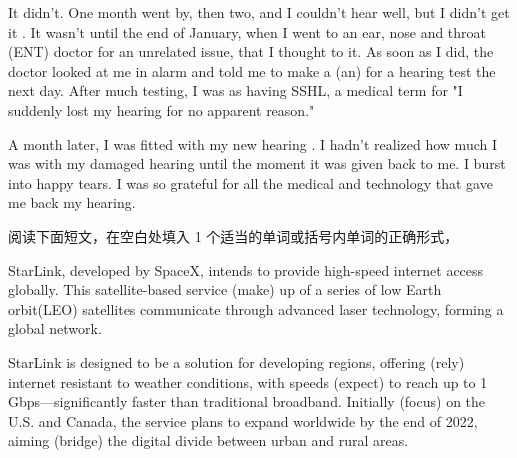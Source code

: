 \documentclass{英语试卷}
\begin{document}
\par It didn't. One month went by, then two, and I  couldn't hear well, but I didn't get it . It wasn't until the end of January, when I went to an ear, nose and throat (ENT) doctor for an unrelated issue, that I thought to  it. As soon as I did, the doctor looked at me in alarm and told me to make a (an)  for a hearing test the next day. After much testing, I was  as having SSHL, a medical term for "I suddenly lost my hearing for no apparent reason."\par
\par A month later, I was fitted with my new hearing . I hadn't realized how much I was  with my damaged hearing until the moment it was given back to me. I burst into happy tears. I was so grateful for all the medical  and technology that gave me back my hearing.\par
{}
\par 阅读下面短文，在空白处填入 1 个适当的单词或括号内单词的正确形式，\par
\par StarLink, developed by SpaceX, intends to provide high-speed internet access globally. This satellite-based service  (make) up of a series of low Earth orbit(LEO) satellites  communicate through advanced laser technology, forming a global network.\par
\par StarLink is designed to be a solution for developing regions, offering  (rely) internet resistant to weather conditions, with speeds  (expect) to reach up to 1 Gbps—significantly faster than traditional broadband. Initially  (focus) on the U.S. and Canada, the service plans to expand worldwide by the end of 2022, aiming  (bridge) the digital divide between urban and rural areas.\par
\end{document}
